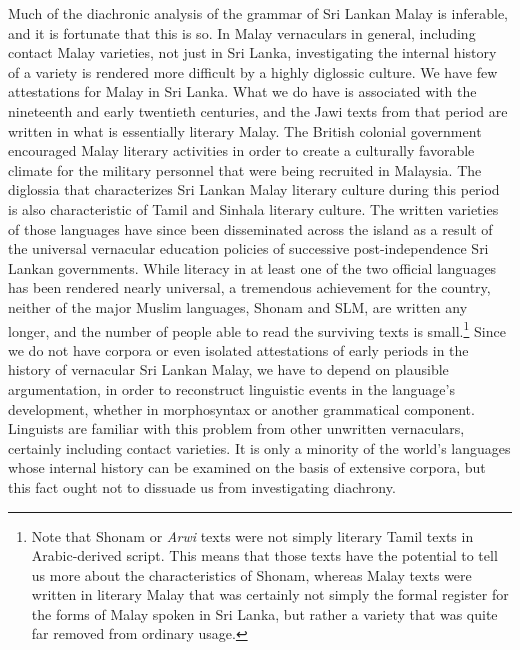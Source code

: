 Much of the diachronic analysis of the grammar of Sri Lankan Malay is inferable, and it is fortunate that this is so. In Malay vernaculars in general, including contact Malay varieties, not just in Sri Lanka, investigating the internal history of a variety is rendered more difficult by a highly diglossic culture. We have few attestations for Malay in Sri Lanka. What we do have is associated with the nineteenth and early twentieth centuries, and the Jawi texts from that period are written in what is essentially literary Malay. The British colonial government encouraged Malay literary activities in order to create a culturally favorable climate for the military personnel that were being recruited in Malaysia. The diglossia that characterizes Sri Lankan Malay literary culture during this period is also characteristic of Tamil and Sinhala literary culture. The written varieties of those languages have since been disseminated across the island as a result of the universal vernacular education policies of successive post-independence Sri Lankan governments. While literacy in at least one of the two official languages has been rendered nearly universal, a tremendous achievement for the country, neither of the major Muslim languages, Shonam and SLM, are written any longer, and the number of people able to read the surviving texts is small.\footnote{Note
  that Shonam or \textit{Arwi} texts were not simply literary Tamil texts in Arabic-derived script. This means that those texts have the potential to tell us more about the characteristics of Shonam, whereas Malay texts were written in literary Malay that was certainly not simply the formal register for the forms of Malay spoken in Sri Lanka, but rather a variety that was quite far removed from ordinary usage. 
} 
Since we do not have corpora or even isolated attestations of early periods in the history of vernacular Sri Lankan Malay, we have to depend on plausible argumentation, in order to reconstruct linguistic events in the language's development, whether in morphosyntax or another grammatical component. Linguists are familiar with this problem from other unwritten vernaculars, certainly including contact varieties. It is only a minority of the world's languages whose internal history can be examined on the basis of extensive corpora, but this fact ought not to dissuade us from investigating diachrony.
